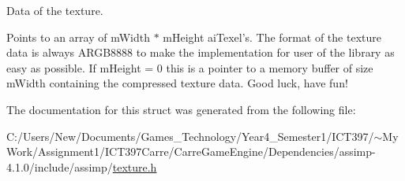 Data of the texture.

Points to an array of mWidth $\ast$ mHeight aiTexel's. The format of the texture data is always ARGB8888 to make the implementation for user of the library as easy as possible. If mHeight = 0 this is a pointer to a memory buffer of size mWidth containing the compressed texture data. Good luck, have fun! 

The documentation for this struct was generated from the following file:\begin{CompactItemize}
\item 
C:/Users/New/Documents/Games\_\-Technology/Year4\_\-Semester1/ICT397/$\sim$My Work/Assignment1/ICT397Carre/CarreGameEngine/Dependencies/assimp-4.1.0/include/assimp/\hyperlink{texture_8h}{texture.h}\end{CompactItemize}
